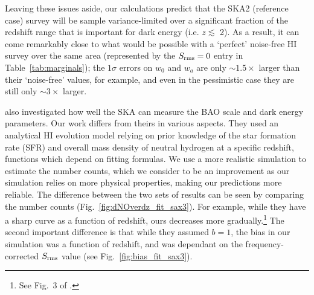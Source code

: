 \documentclass[useAMS,usenatbib]{mn2e}
\begin{document}
Leaving these issues aside, our calculations predict that the SKA2 (reference case) survey will be sample variance-limited over a significant fraction of the redshift range that is important for dark energy (i.e. $z \lesssim$ 2). As a result, it can come remarkably close to what would be possible with a `perfect' noise-free HI survey over the same area (represented by the $S_{\rm rms}=0$ entry in Table~\ref{tab:marginals}); the $1\sigma$ errors on $w_0$ and $w_a$ are only $\sim 1.5\times$ larger than their `noise-free' values, for example, and even in the pessimistic case they are still only $\sim 3\times$ larger.



\citet{Abdalla:2009wr} also investigated how well the SKA can measure the BAO scale and dark energy parameters. Our work differs from theirs in various aspects.  They used an analytical HI evolution model relying on prior knowledge of the star formation rate (SFR) and overall mass density of neutral hydrogen at a specific redshift, functions which depend on fitting formulas. We use a more realistic simulation to estimate the number counts, which we consider to be an improvement as our simulation relies on more physical properties, making our predictions more reliable.  The difference between the two sets of results can be seen by comparing the number counts (Fig.~\ref{fig:dNOverdz_fit_sax3}). For example, while they have a sharp curve as a function of redshift, ours decreases more gradually.\footnote{See Fig.~3 of \citet{Abdalla:2009wr}.} The second important difference is that while they assumed $b=1$, the bias in our simulation was a function of redshift, and was dependant on the frequency-corrected $S_{\rm rms}$ value (see Fig.~\ref{fig:bias_fit_sax3}).
\end{document}
